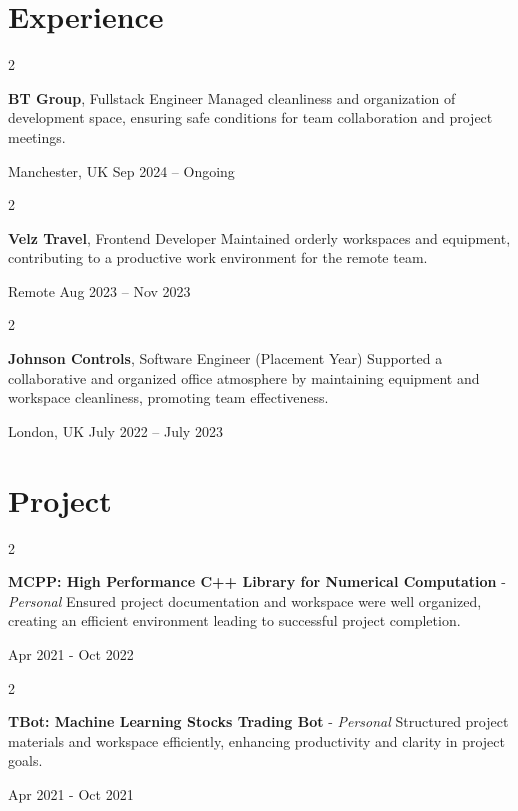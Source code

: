 \documentclass[10pt, letterpaper]{article}
\newenvironment{twocolentry}[2][]{
\onecolentry
\def\secondColumn{#2}
\setcolumnwidth{\fill, 4.5 cm}
\begin{paracol}{2}
}{
\switchcolumn \raggedleft \secondColumn
\end{paracol}
\endonecolentry
} %
\begin{document}
\medskip

\section{Experience}

\begin{twocolentry}{
Manchester, UK
Sep 2024 – Ongoing
}
\textbf{BT Group}, Fullstack Engineer
Managed cleanliness and organization of development space, ensuring safe conditions for team collaboration and project meetings.

\end{twocolentry}
\vspace{0.2 cm}

\begin{twocolentry}{
Remote
Aug 2023 – Nov 2023
}
\textbf{Velz Travel}, Frontend Developer
Maintained orderly workspaces and equipment, contributing to a productive work environment for the remote team.

\end{twocolentry}
\vspace{0.2 cm}

\begin{twocolentry}{
London, UK
July 2022 – July 2023
}
\textbf{Johnson Controls}, Software Engineer (Placement Year)
Supported a collaborative and organized office atmosphere by maintaining equipment and workspace cleanliness, promoting team effectiveness.

\end{twocolentry}
\medskip

\section{Project}

\begin{twocolentry}{Apr 2021 - Oct 2022}
\textbf{MCPP: High Performance C++ Library for Numerical Computation} - \textit{Personal}  
\newline 
\newline Ensured project documentation and workspace were well organized, creating an efficient environment leading to successful project completion.

\end{twocolentry}
                  

\begin{twocolentry}{Apr 2021 - Oct 2021}
\textbf{TBot: Machine Learning Stocks Trading Bot} - \textit{Personal}  
\newline 
\newline Structured project materials and workspace efficiently, enhancing productivity and clarity in project goals.

\end{twocolentry}
\medskip
\end{document}
